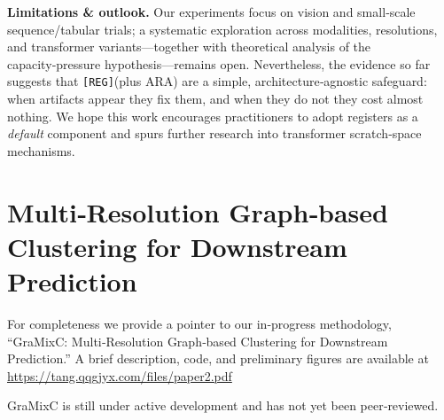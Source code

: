 \documentclass{article}
\newcommand{\RegTok}{\texttt{[REG]}\xspace}
\newcommand{\OURS}{\textsc{ARA}\xspace}
\begin{document}
\smallskip
\noindent\textbf{Limitations \& outlook.}
Our experiments focus on vision and small‑scale sequence/tabular trials; a systematic exploration across modalities, resolutions, and transformer variants—together with theoretical analysis of the capacity‑pressure hypothesis—remains open.  Nevertheless, the evidence so far suggests that \RegTok (plus \OURS) are a simple, architecture‑agnostic safeguard: when artifacts appear they fix them, and when they do not they cost almost nothing.
We hope this work encourages practitioners to adopt registers as a \emph{default} component and spurs further research into transformer scratch‑space mechanisms.



\printbibliography


\appendix

\section{Multi‑Resolution Graph‑based Clustering for Downstream Prediction}
\label{sec:gmc}

For completeness we provide a pointer to our in‑progress methodology, ``GraMixC: Multi‑Resolution Graph‑based Clustering for Downstream Prediction.''
A brief description, code, and preliminary figures are available at         \url{https://tang.qqgjyx.com/files/paper2.pdf}

GraMixC is still under active development and has not yet been peer‑reviewed.
\end{document}
